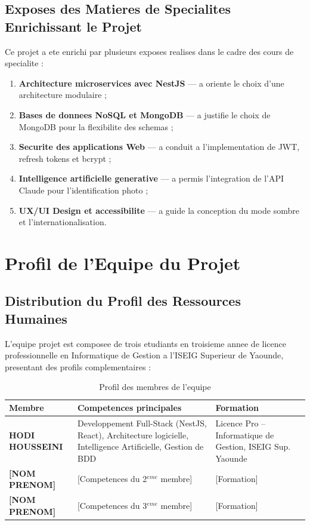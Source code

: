 \documentclass[12pt,a4paper]{report}
\begin{document}
\section{Exposes des Matieres de Specialites Enrichissant le Projet}

Ce projet a ete enrichi par plusieurs exposes realises dans le cadre des cours de specialite :

\begin{enumerate}[label=\textcolor{vertpharma}{\arabic*.},leftmargin=*]
    \item \textbf{Architecture microservices avec NestJS} --- a oriente le choix d'une architecture modulaire ;
    \item \textbf{Bases de donnees NoSQL et MongoDB} --- a justifie le choix de MongoDB pour la flexibilite des schemas ;
    \item \textbf{Securite des applications Web} --- a conduit a l'implementation de JWT, refresh tokens et bcrypt ;
    \item \textbf{Intelligence artificielle generative} --- a permis l'integration de l'API Claude pour l'identification photo ;
    \item \textbf{UX/UI Design et accessibilite} --- a guide la conception du mode sombre et l'internationalisation.
\end{enumerate}

\chapter{Profil de l'Equipe du Projet}

\section{Distribution du Profil des Ressources Humaines}

L'equipe projet est composee de trois etudiants en troisieme annee de licence professionnelle en Informatique de Gestion a l'ISEIG Superieur de Yaounde, presentant des profils complementaires :

\begin{table}[ht]
\centering
\caption{Profil des membres de l'equipe}
\renewcommand{\arraystretch}{1.6}
\begin{tabularx}{\textwidth}{|l|X|X|}
\hline
\rowcolor{vertpharma!20}
\textbf{Membre} & \textbf{Competences principales} & \textbf{Formation} \\ \hline
\textbf{HODI HOUSSEINI} & Developpement Full-Stack (NestJS, React), Architecture logicielle, Intelligence Artificielle, Gestion de BDD & Licence Pro -- Informatique de Gestion, ISEIG Sup. Yaounde \\ \hline
\textbf{[NOM PRENOM]} & [Competences du 2$^{eme}$ membre] & [Formation] \\ \hline
\textbf{[NOM PRENOM]} & [Competences du 3$^{eme}$ membre] & [Formation] \\ \hline
\end{tabularx}
\end{table}
\end{document}
